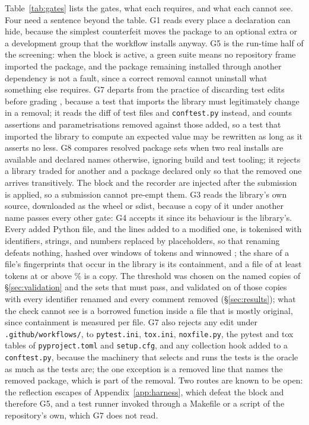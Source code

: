 \documentclass[11pt]{article}
\newcommand{\code}[1]{\texttt{\small #1}}
\begin{document}
Table~\ref{tab:gates} lists the gates, what each requires, and what each cannot see.
Four need a sentence beyond the table.
G1 reads every place a declaration can hide, because the simplest counterfeit moves the package to an optional extra or a development group that the workflow installs anyway.
G5 is the run-time half of the screening: when the block is active, a green suite means no repository frame imported the package, and the package remaining installed through another dependency is not a fault, since a correct removal cannot uninstall what something else requires.
G7 departs from the practice of discarding test edits before grading \citep{jimenez2024swebench}, because a test that imports the library must legitimately change in a removal; it reads the diff of test files and \code{conftest.py} instead, and counts assertions and parametrisations removed against those added, so a test that imported the library to compute an expected value may be rewritten as long as it asserts no less.
G8 compares resolved package sets when two real installs are available and declared names otherwise, ignoring build and test tooling; it rejects a library traded for another and a package declared only so that the removed one arrives transitively.
The block and the recorder are injected after the submission is applied, so a submission cannot pre-empt them.
G3 reads the library's own source, downloaded as the wheel or sdist, because a copy of it under another name passes every other gate: G4 accepts it since its behaviour is the library's.
Every added Python file, and the lines added to a modified one, is tokenised with identifiers, strings, and numbers replaced by placeholders, so that renaming defeats nothing, hashed over windows of \gThreeK{} tokens and winnowed \citep{schleimer2003winnowing}; the share of a file's fingerprints that occur in the library is its containment, and a file of at least \gThreeMinTokens{} tokens at or above \gThreeThreshold\% is a copy.
The threshold was chosen on the \nVendorNamed{} named copies of \S\ref{sec:validation} and the sets that must pass, and validated on \nVendorRenamed{} of those copies with every identifier renamed and every comment removed (\S\ref{sec:results}); what the check cannot see is a borrowed function inside a file that is mostly original, since containment is measured per file.
G7 also rejects any edit under \code{.github/workflows/}, to \code{pytest.ini}, \code{tox.ini}, \code{noxfile.py}, the pytest and tox tables of \code{pyproject.toml} and \code{setup.cfg}, and any collection hook added to a \code{conftest.py}, because the machinery that selects and runs the tests is the oracle as much as the tests are; the one exception is a removed line that names the removed package, which is part of the removal.
Two routes are known to be open: the reflection escapes of Appendix~\ref{app:harness}, which defeat the block and therefore G5, and a test runner invoked through a Makefile or a script of the repository's own, which G7 does not read.
\end{document}
